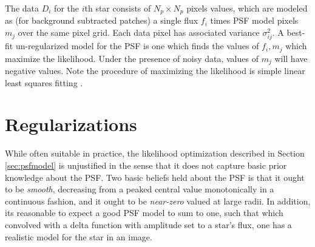 \documentclass[12pt,preprint]{aastex}
\begin{document}
\noindent The data $D_i$ for the $i$th star consists of $N_p \times N_p$ pixels values, 
which are modeled as (for background subtracted patches) a single flux $f_i$ times PSF 
model pixels $m_j$ over the same pixel grid.  Each data pixel has associated variance 
$\sigma_{ij}^2$.  A best-fit un-regularized model for the PSF is one which finds the values 
of $f_i,m_j$ which maximize the likelihood.  Under the presence of noisy data, values of 
$m_j$ will have negative values.  Note the procedure of maximizing the likelihood is 
simple linear least squares fitting \citep{hoggdatarecipes}.

\section{Regularizations}
\label{sec:regularizations}

While often suitable in practice, the likelihood optimization described in Section \ref{sec:psfmodel} 
is unjustified in the sense that it does not capture basic prior knowledge about the PSF.  Two 
basic beliefs held about the PSF is that it ought to be \emph{smooth}, decreasing from a peaked 
central value monotonically in a continuous fashion, and it ought to be \emph{near-zero} valued 
at large radii.   In addition, its reasonable to expect a good PSF model to sum to one, such that 
which convolved with a delta function with amplitude set to a star's flux, one has a realistic model for 
the star in an image.
\end{document}
